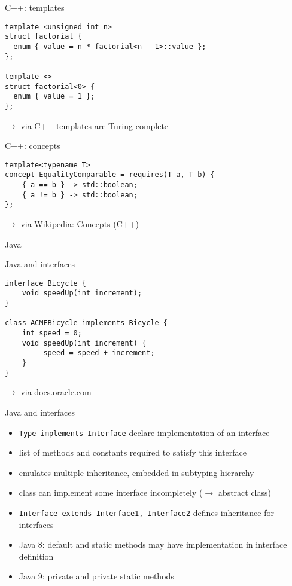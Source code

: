 \documentclass{beamer}
\newcommand\source[1]{$\rightarrow$ via #1}
\begin{document}
\begin{frame}[fragile]{C++: templates}
  \begin{verbatim}
template <unsigned int n>
struct factorial {
  enum { value = n * factorial<n - 1>::value };
};

template <>
struct factorial<0> {
  enum { value = 1 };
};
  \end{verbatim}

  \source{\href{https://citeseerx.ist.psu.edu/viewdoc/summary?doi=10.1.1.14.3670}{C++ templates are Turing-complete}}
\end{frame}

\begin{frame}[fragile]{C++: concepts}
  \begin{verbatim}
template<typename T>
concept EqualityComparable = requires(T a, T b) {
    { a == b } -> std::boolean;
    { a != b } -> std::boolean;
};
  \end{verbatim}

  $\rightarrow$ via \href{https://en.wikipedia.org/wiki/Concepts_(C%2B%2B)}{Wikipedia: Concepts (C++)}
\end{frame}

\begin{frame}[standout]
  Java
\end{frame}

\begin{frame}[fragile]{Java and interfaces}
  \begin{verbatim}
interface Bicycle {
    void speedUp(int increment);
}

class ACMEBicycle implements Bicycle {
    int speed = 0;
    void speedUp(int increment) {
         speed = speed + increment;   
    }
}
  \end{verbatim}

  \source{\href{https://docs.oracle.com/javase/tutorial/java/concepts/interface.html}{docs.oracle.com}}
\end{frame}

\begin{frame}[fragile]{Java and interfaces}
  \begin{itemize}
    \item \texttt{Type implements Interface} declare implementation of an interface
    \item list of methods and constants required to satisfy this interface
    \item emulates multiple inheritance, embedded in subtyping hierarchy
    \item class can implement some interface incompletely ($\rightarrow$ abstract class)
    \item \texttt{Interface extends Interface1, Interface2} defines inheritance for interfaces
    \item Java 8: default and static methods may have implementation in interface definition
    \item Java 9: private and private static methods
  \end{itemize}
\end{frame}
\end{document}
